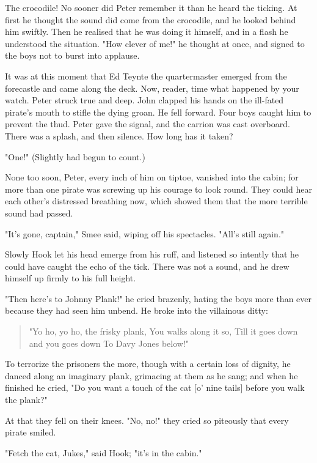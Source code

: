 The crocodile! No sooner did Peter remember it than he heard the ticking.
At first he thought the sound did come from the crocodile, and he looked
behind him swiftly. Then he realised that he was doing it himself, and in
a flash he understood the situation. "How clever of me!" he thought at
once, and signed to the boys not to burst into applause.


It was at this moment that Ed Teynte the quartermaster emerged from the
forecastle and came along the deck. Now, reader, time what happened by
your watch. Peter struck true and deep. John clapped his hands on the
ill-fated pirate's mouth to stifle the dying groan. He fell forward. Four
boys caught him to prevent the thud. Peter gave the signal, and the
carrion was cast overboard. There was a splash, and then silence. How long
has it taken?


"One!" (Slightly had begun to count.)


None too soon, Peter, every inch of him on tiptoe, vanished into the
cabin; for more than one pirate was screwing up his courage to look round.
They could hear each other's distressed breathing now, which showed them
that the more terrible sound had passed.


"It's gone, captain," Smee said, wiping off his spectacles. "All's still
again."


Slowly Hook let his head emerge from his ruff, and listened so intently
that he could have caught the echo of the tick. There was not a sound, and
he drew himself up firmly to his full height.


"Then here's to Johnny Plank!" he cried brazenly, hating the boys more
than ever because they had seen him unbend. He broke into the villainous
ditty:

\begin{verse}
     "Yo ho, yo ho, the frisky plank,
     You walks along it so,
     Till it goes down and you goes down
     To Davy Jones below!"
\end{verse}

To terrorize the prisoners the more, though with a certain loss of
dignity, he danced along an imaginary plank, grimacing at them as he sang;
and when he finished he cried, "Do you want a touch of the cat [o' nine
tails] before you walk the plank?"


At that they fell on their knees. "No, no!" they cried so piteously that
every pirate smiled.


"Fetch the cat, Jukes," said Hook; "it's in the cabin."


